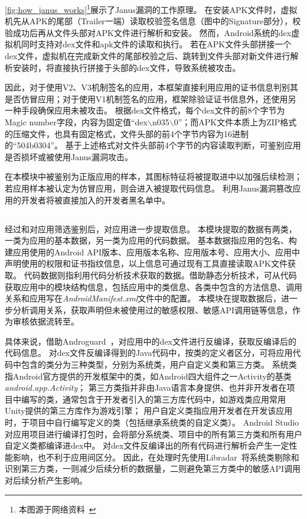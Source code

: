 \autoref{fig:how_janus_works}\footnote{本图源于网络资料~\cite{CVE_2017_13156}}展示了Janus漏洞的工作原理。
在安装APK文件时，虚拟机先从APK的尾部（Trailer一端）读取校验签名信息（图中的Signature部分），校验成功后再从文件头部对APK文件进行解析和安装。
然而，Android系统的dex虚拟机同时支持对dex文件和apk文件的读取和执行。
若在APK文件头部拼接一个dex文件，虚拟机在完成新文件的尾部校验之后、跳转到文件头部对新文件进行解析安装时，将直接执行拼接于头部的dex文件，导致系统被攻击。

因此，对于使用V2、V3机制签名的应用，本框架直接利用应用的证书信息判别其是否仿冒应用；对于使用V1机制签名的应用，框架除验证证书信息外，还使用另一种手段确保应用未被攻击。
根据dex文件格式，每个dex文件的前8个字节为Magic number字段，内容为固定值``dex$\backslash$n035$\backslash$0''；而APK文件本质上为ZIP格式的压缩文件，也具有固定格式，文件头部的前4个字节内容为16进制的``504b0304''。
基于上述格式对文件头部前4个字节的内容读取判断，可鉴别应用是否损坏或被使用Janus漏洞攻击。

在本模块中被鉴别为正版应用的样本，其图标特征将被提取进\componentE 中以加强后续检测；若应用样本被认定为仿冒应用，则会进入\componentC 被提取代码信息。
利用Janus漏洞篡改应用的开发者将被直接加入\componentE 的开发者黑名单中。

\subsection{\componentC }

经过\componentA 和\componentB 对应用筛选鉴别后，\componentC 对应用进一步提取信息。
本模块提取的数据有两类，一类为应用的基本数据，另一类为应用的代码数据。
基本数据指应用的包名、构建应用使用的Android API版本、应用版本名称、应用版本号、应用大小、应用中声明使用的权限和证书指纹信息，以上信息可通过现有工具直接读取APK文件获取。
代码数据则指利用代码分析技术获取的数据。借助静态分析技术，\componentC 可从代码获取应用中的模块结构信息，包括应用中的类信息、各类中包含的方法信息、调用关系和应用写在\textit{AndroidManifest.xml}文件中的配置。
本模块在提取数据后，进一步分析调用关系，获取声明但未被使用过的敏感权限、敏感API调用链等信息，作为审核依据流转至\componentD 。

具体来说，\componentC 借助Androguard~\cite{Androguard}，对应用中的dex文件进行反编译，获取反编译后的代码信息。
对dex文件反编译得到的Java代码中，按类的定义者区分，可将应用代码中包含的类分为三种类型，分别为系统类，用户自定义类和第三方类。
系统类指Android官方提供的开发框架中的类，如Android四大组件之一Activity的基类\textit{android.app.Activity}；
第三方类指并非由Java语言本身提供、也并非开发者在项目中编写的类，通常包含于开发者引入的第三方库代码中，如游戏类应用常用Unity提供的第三方库作为游戏引擎；
用户自定义类指应用开发者在开发该应用时，于项目中自行编写定义的类（包括继承系统类的自定义类）。
Android Studio对应用项目进行编译打包时，会将部分系统类、项目中的所有第三方类和所有用户自定义类都编译进dex中。
对dex文件反编译出的所有代码进行解析会产生一定性能影响，也不利于应用间区分。
因此，\componentC 在处理时先使用Libradar~\cite{ma2016libradar}将系统类剔除和识别第三方类，一则减少后续分析的数据量，二则避免第三方类中的敏感API调用对后续分析产生影响。

